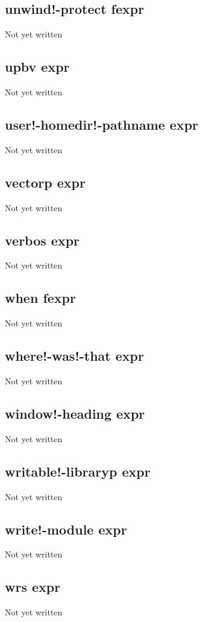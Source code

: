\documentclass[a4paper,11pt]{article}
\begin{document}
\subsection{\ttfamily unwind!-protect fexpr}
Not yet written

\subsection{\ttfamily upbv expr}
Not yet written

\subsection{\ttfamily user!-homedir!-pathname expr}
Not yet written

\subsection{\ttfamily vectorp expr}
Not yet written

\subsection{\ttfamily verbos expr}
Not yet written

\subsection{\ttfamily when fexpr}
Not yet written

\subsection{\ttfamily where!-was!-that expr}
Not yet written

\subsection{\ttfamily window!-heading expr}
Not yet written

\subsection{\ttfamily writable!-libraryp expr}
Not yet written

\subsection{\ttfamily write!-module expr}
Not yet written

\subsection{\ttfamily wrs expr}
Not yet written
\end{document}
